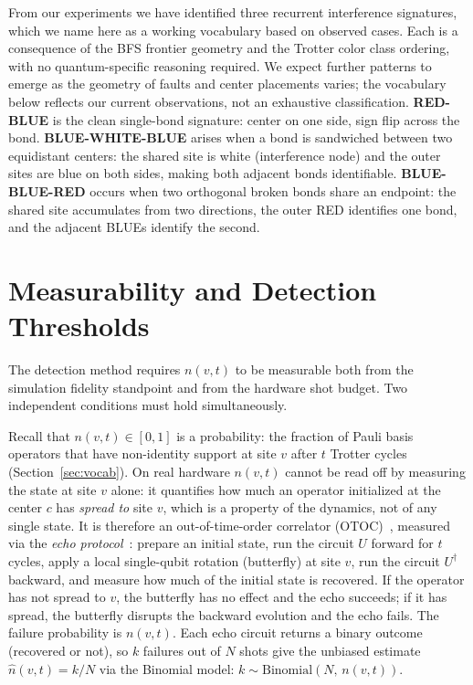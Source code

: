 \documentclass[11pt]{article}
\begin{document}
From our experiments we have identified three recurrent interference signatures,
which we name here as a working vocabulary based on observed cases. Each is a
consequence of the BFS frontier geometry and the Trotter color class ordering,
with no quantum-specific reasoning required. We expect further patterns to emerge
as the geometry of faults and center placements varies; the vocabulary below
reflects our current observations, not an exhaustive classification.
\textbf{RED-BLUE} is the clean single-bond signature: center on one side,
sign flip across the bond. \textbf{BLUE-WHITE-BLUE} arises when a bond is
sandwiched between two equidistant centers: the shared site is white (interference
node) and the outer sites are blue on both sides, making both adjacent bonds
identifiable. \textbf{BLUE-BLUE-RED} occurs when two orthogonal broken bonds
share an endpoint: the shared site accumulates from two directions, the outer
RED identifies one bond, and the adjacent BLUEs identify the second.


\section{Measurability and Detection Thresholds}

The detection method requires $n(v,t)$ to be measurable both from the
simulation fidelity standpoint and from the hardware shot budget.
Two independent conditions must hold simultaneously.

Recall that $n(v,t) \in [0,1]$ is a probability: the fraction of Pauli basis
operators that have non-identity support at site $v$ after $t$ Trotter cycles
(Section~\ref{sec:vocab}). On real hardware $n(v,t)$ cannot be read off by
measuring the state at site $v$ alone: it quantifies how much an operator
initialized at the center $c$ has \emph{spread to} site $v$, which is a
property of the dynamics, not of any single state. It is therefore an
out-of-time-order correlator (OTOC)~\cite{Kitaev2015Hidden}, measured via
the \emph{echo protocol}~\cite{Swingle2016Measuring,Mi2021Information}:
prepare an initial state, run the circuit $U$ forward for $t$ cycles,
apply a local single-qubit rotation (butterfly) at site $v$,
run the circuit $U^\dagger$ backward, and measure how much of the
initial state is recovered. If the operator has not spread to $v$,
the butterfly has no effect and the echo succeeds; if it has spread,
the butterfly disrupts the backward evolution and the echo fails.
The failure probability is $n(v,t)$. Each echo circuit returns a
binary outcome (recovered or not), so $k$ failures out of $N$ shots
give the unbiased estimate $\hat{n}(v,t) = k/N$ via the Binomial model:
$k \sim \mathrm{Binomial}(N,\,n(v,t))$.
\end{document}
